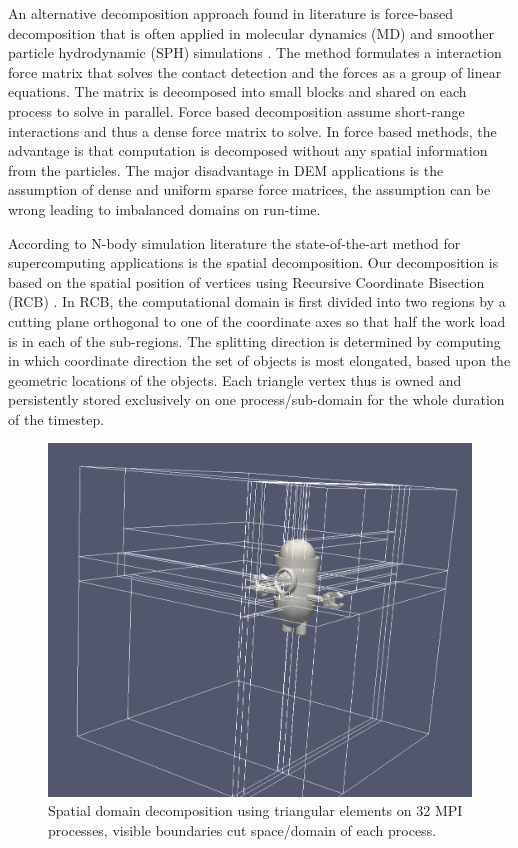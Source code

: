 \documentclass[times,12pt]{article}
\begin{document}
An alternative decomposition approach found in literature is force-based decomposition that is often applied in molecular dynamics (MD) and smoother particle hydrodynamic (SPH) simulations \cite{Bowers2007, Gaburov, Gonnet2014, Plimpton1995, Rycroft2012, Shaw2005}. The method formulates a interaction force matrix that solves the contact detection and the forces as a group of linear equations. The matrix is decomposed into small blocks and shared on each process to solve in parallel. Force based decomposition assume short-range interactions and thus a dense force matrix to solve. In force based methods, the advantage is that computation is decomposed without any spatial information from the particles. The major disadvantage in DEM applications is the assumption of dense and uniform sparse force matrices, the assumption can be wrong leading to imbalanced domains on run-time.   

According to N-body simulation literature \cite{Eckhardt2014, Fleissner, Wachs2012a, zomorodian2002} the state-of-the-art method for supercomputing applications is the spatial decomposition. Our decomposition is based on the spatial position of vertices using Recursive Coordinate Bisection (RCB) \cite{ZoltanIsorropiaOverview2012}. In RCB, the computational domain is first divided into two regions by a cutting plane orthogonal to one of the coordinate axes so that half the work load is in each of the sub-regions. The splitting direction is determined by computing in which coordinate direction the set of objects is most elongated, based upon the geometric locations of the objects. Each triangle vertex thus is owned and persistently stored exclusively on one process/sub-domain for the whole duration of the timestep. 

\begin{figure}[!h]
\centering
\includegraphics[width=1\textwidth]{minion} \protect\caption{\label{fig5}Spatial domain decomposition using triangular elements on 32 MPI processes, visible boundaries cut space/domain of each process.}
\end{figure}
\end{document}
